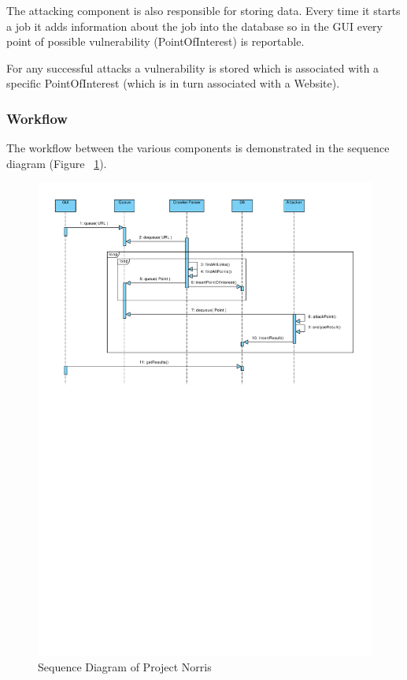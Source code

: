 \documentclass[12pt,a4paper]{article}
\begin{document}
The attacking component is also responsible for storing data.  Every time it starts a job it adds information about the job into the database so in the GUI every point of possible vulnerability (PointOfInterest) is reportable. 

For any successful attacks a vulnerability is stored which is associated with a specific PointOfInterest (which is in turn associated with a Website).

\subsubsection{Workflow}
The workflow between the various components is demonstrated in the sequence diagram (Figure ~\ref{fig:workflow}).

\begin{figure}[!ht]
    \begin{center}
        \includegraphics[angle=90]{images/system_sequence_diagram.pdf}    
    \end{center}
    \caption{Sequence Diagram of Project Norris}
    \label{fig:workflow}
\end{figure}
\end{document}
